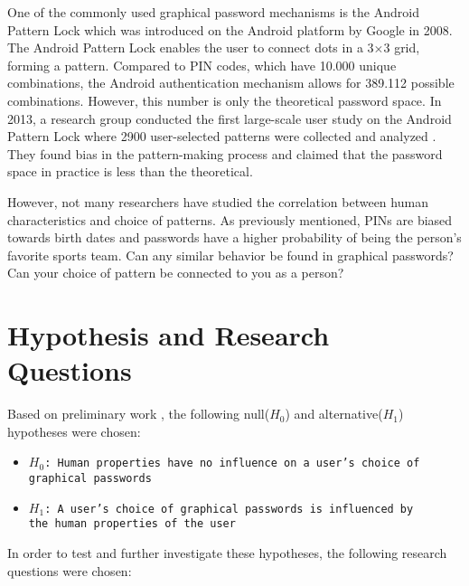     One of the commonly used graphical password mechanisms is the Android Pattern Lock which was introduced on the Android platform by Google in 2008. The Android Pattern Lock enables the user to connect dots in a 3$\times$3 grid, forming a pattern. Compared to PIN codes, which have 10.000 unique combinations, the Android authentication mechanism allows for 389.112 possible combinations. However, this number is only the theoretical password space. In 2013, a research group conducted the first large-scale user study on the Android Pattern Lock where 2900 user-selected patterns were collected and analyzed \cite{Uellenbeck}. They found bias in the pattern-making process and claimed that the password space in practice is less than the theoretical.

    However, not many researchers have studied the correlation between human characteristics and choice of patterns. As previously mentioned, PINs are biased towards birth dates and passwords have a higher probability of being the person's favorite sports team. Can any similar behavior be found in graphical passwords? Can your choice of pattern be connected to you as a person?

  \section{Hypothesis and Research Questions}\label{sec:hypothesis}
    Based on preliminary work \cite{prosjektoppgave}, the following null($H_0$) and alternative($H_1$) hypotheses were chosen:

    {\renewcommand\labelitemi{}
      \begin{itemize}
        \item \texttt{$H_{0}$: Human properties have no influence on a user's choice of \\graphical passwords}
        \item \texttt{$H_{1}$: A user's choice of graphical passwords is influenced by \\the human properties of the user}
      \end{itemize}
    }
    
    In order to test and further investigate these hypotheses, the following research questions were chosen:

